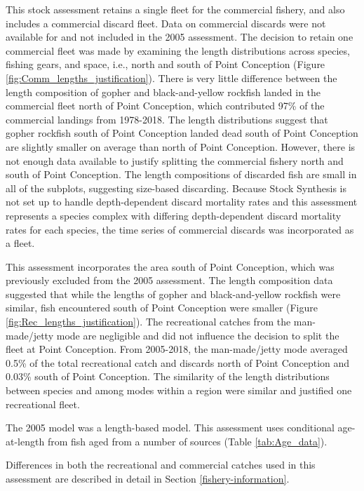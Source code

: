 \documentclass[12pt,]{article}
\begin{document}
This stock assessment retains a single fleet for the commercial fishery,
and also includes a commercial discard fleet. Data on commercial
discards were not available for and not included in the 2005 assessment.
The decision to retain one commercial fleet was made by examining the
length distributions across species, fishing gears, and space, i.e.,
north and south of Point Conception (Figure
\ref{fig:Comm_lengths_justification}). There is very little difference
between the length composition of gopher and black-and-yellow rockfish
landed in the commercial fleet north of Point Conception, which
contributed 97\% of the commercial landings from 1978-2018. The length
distributions suggest that gopher rockfish south of Point Conception
landed dead south of Point Conception are slightly smaller on average
than north of Point Conception. However, there is not enough data
available to justify splitting the commercial fishery north and south of
Point Conception. The length compositions of discarded fish are small in
all of the subplots, suggesting size-based discarding. Because Stock
Synthesis is not set up to handle depth-dependent discard mortality
rates and this assessment represents a species complex with differing
depth-dependent discard mortality rates for each species, the time
series of commercial discards was incorporated as a fleet.

This assessment incorporates the area south of Point Conception, which
was previously excluded from the 2005 assessment. The length composition
data suggested that while the lengths of gopher and black-and-yellow
rockfish were similar, fish encountered south of Point Conception were
smaller (Figure \ref{fig:Rec_lengths_justification}). The recreational
catches from the man-made/jetty mode are negligible and did not
influence the decision to split the fleet at Point Conception. From
2005-2018, the man-made/jetty mode averaged 0.5\% of the total
recreational catch and discards north of Point Conception and 0.03\%
south of Point Conception. The similarity of the length distributions
between species and among modes within a region were similar and
justified one recreational fleet.

The 2005 model was a length-based model. This assessment uses
conditional age-at-length from fish aged from a number of sources (Table
\ref{tab:Age_data}).

Differences in both the recreational and commercial catches used in this
assessment are described in detail in Section \ref{fishery-information}.
\end{document}
